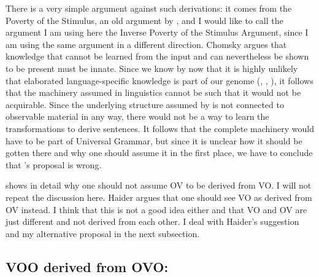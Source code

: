 \noindent
There is a very simple argument against such derivations: it comes from the Poverty of the
Stimulus, an old argument by \citet[]{Chomsky80b-u}, and I would like to call the argument I
am using here the Inverse Poverty of the Stimulus Argument\label{pos-argument}, since I am using the same argument in a
different direction. Chomsky argues that knowledge that cannot be learned from the
input and can nevertheless be shown to be present must be innate. Since we know by now that it is
highly unlikely that elaborated language-specific knowledge is part of our genome
(\citealt*{HCF2002a}, \cites{Bishop2002a}[Section~6.4.2.2]{Dabrowska2004a}, \citeauthor{FM2005a} \citeyear{FM2005a}), it follows that
the machinery assumed in linguistics cannot be such that it would not be acquirable. Since the
underlying structure assumed by \citeauthor{Laenzlinger2004a} is not connected to observable
material in any way, there would not be a way to learn the transformations to derive 
sentences. It follows that the complete machinery would have to be part of Universal Grammar, but
since it is unclear how it should be gotten there and why one should assume it in the first place,
we have to conclude that \citeauthor{Kayne94a-u}'s proposal is wrong.

\largerpage[1.1]
\citet{Haider2000a} shows in detail why one should not assume OV to be derived from VO. I will not
repeat the discussion here. Haider argues that one should see VO as derived from OV instead. I think
that this is not a good idea either and that VO and OV are just different and not derived from
each other. I deal with Haider's suggestion and my alternative proposal in the next subsection.


\subsection{VOO derived from OVO: \citet{Haider2020a}}
\label{sec-vo-derived-from-ov}


